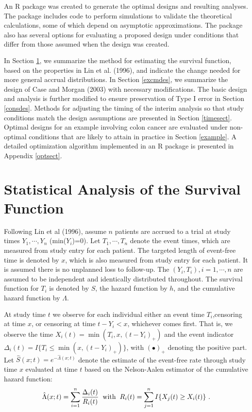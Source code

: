 \documentclass[12pt]{article}
\begin{document}
An R package was created to generate the optimal designs and resulting analyses. The package
includes code to perform simulations to validate the theoretical calculations, some of which depend
on asymptotic approximations.  The package also has several options for evaluating a proposed
design under conditions that differ from those assumed when the design was created.


In Section \ref{surv}, we summarize the method for estimating the survival function, based on the
properties in Lin et al. (1996), and indicate the change needed for more general accrual
distributions. In Section \ref{excmdes}, we summarize the design of Case and Morgan (2003) with
necessary modifications. The basic design and analysis is further modified to ensure preservation
of Type I error in Section \ref{consdes}. Methods for adjusting the timing of the interim analysis
so that study conditions match the design assumptions are presented in Section \ref{timesect}.
Optimal designs for an example involving colon cancer are evaluated under non-optimal conditions
that are likely to attain in practice in Section \ref{example}. A detailed optimization algorithm
implemented in an R package is presented in Appendix \ref{optsect}.

\section{Statistical Analysis of the Survival Function}

\label{surv}
 Following Lin et al (1996), assume $n$ patients are accrued to a trial at study times $Y_1,\cdots, Y_n$ (min($Y_i$)=0).
Let $T_1,\cdots,T_n$ denote the event times, which are measured from study entry for each patient.
The targeted length of event-free time is denoted by $x$, which is also measured from study entry
for each patient.  It is assumed there is no unplanned loss to follow-up. The $(Y_i,T_i), i=1,\cdots,n$ are
assumed to be independent and identically distributed throughout. The survival function for $T_i$
is denoted by $S$, the hazard function by $h$, and the cumulative hazard function by $\Lambda$.

At study time $t$ we observe for each individual either an event time $T_i$,censoring at
time $x$, or censoring at time $t-Y_i<x$, whichever comes first. That is, we observe the time $X_i(t)=\min(T_i, x, (t-Y_i)_+
)$ and the event indicator $\Delta_i(t)=I\{T_i\leq \min(x, (t-Y_i)_+)\}$, with $(\bullet)_+$
denoting the positive part. Let $\hat S(x;t)=e^{-\hat\Lambda(x;t)}$ denote the estimate of the
event-free rate through study time $x$ evaluated at time $t$ based on the Nelson-Aalen estimator of
the cumulative hazard function:
$$\hat\Lambda (x;t)=\sum_{i=1}^{n} \frac{\Delta_i(t)}{R_i(t)} \hspace{0.2cm} \mbox{with}
\hspace{0.2cm} R_i(t)=\sum_{j=1}^{n} I\{X_j(t)\geq X_i(t)\} \  .$$
\end{document}
